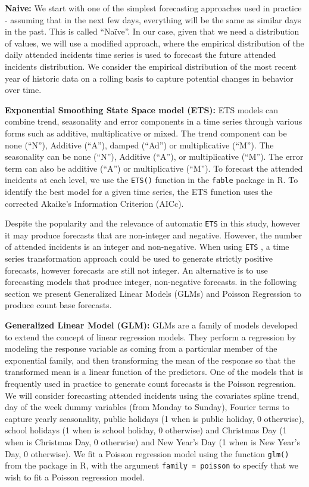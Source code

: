 \documentclass[
  authoryear,
  preprint,
  3p]{elsarticle}
\begin{document}
\textbf{Naive:} We start with one of the simplest forecasting approaches
used in practice - assuming that in the next few days, everything will
be the same as similar days in the past. This is called ``Naïve''. In
our case, given that we need a distribution of values, we will use a
modified approach, where the empirical distribution of the daily
attended incidents time series is used to forecast the future attended
incidents distribution. We consider the empirical distribution of the
most recent year of historic data on a rolling basis to capture
potential changes in behavior over time.

\textbf{Exponential Smoothing State Space model (ETS):} ETS models
\citep{hyndman2021forecasting} can combine trend, seasonality and error
components in a time series through various forms such as additive,
multiplicative or mixed. The trend component can be none (``N''),
Additive (``A''), damped (``Ad'') or multiplicative (``M''). The
seasonality can be none (``N''), Additive (``A''), or multiplicative
(``M''). The error term can also be additive (``A'') or multiplicative
(``M''). To forecast the attended incidents at each level, we use the
\texttt{ETS()} function in the \texttt{fable} package \citep{fable2022}
in R. To identify the best model for a given time series, the ETS
function uses the corrected Akaike's Information Criterion (AICc).

Despite the popularity and the relevance of automatic \texttt{ETS} in
this study, however it may produce forecasts that are non-integer and
negative. However, the number of attended incidents is an integer and
non-negative. When using \texttt{ETS} , a time series transformation
approach could be used to generate strictly positive forecasts, however
forecasts are still not integer. An alternative is to use forecasting
models that produce integer, non-negative forecasts. in the following
section we present Generalized Linear Models (GLMs) and Poisson
Regression to produce count base forecasts.

\textbf{Generalized Linear Model (GLM): } GLMs are a family of models
developed to extend the concept of linear regression models. They
perform a regression by modeling the response variable as coming from a
particular member of the exponential family, and then transforming the
mean of the response so that the transformed mean is a linear function
of the predictors. One of the models that is frequently used in practice
to generate count forecasts is the Poisson regression. We will consider
forecasting attended incidents using the covariates spline trend, day of
the week dummy variables (from Monday to Sunday), Fourier terms to
capture yearly seasonality, public holidays (1 when is public holiday, 0
otherwise), school holidays (1 when is school holiday, 0 otherwise) and
Christmas Day (1 when is Christmas Day, 0 otherwise) and New Year's Day
(1 when is New Year's Day, 0 otherwise). We fit a Poisson regression
model using the function \texttt{glm()} from the package in R, with the
argument \texttt{family\ =\ poisson} to specify that we wish to fit a
Poisson regression model.
\end{document}
